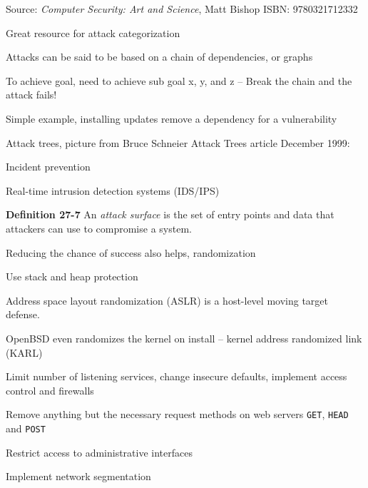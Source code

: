 \documentclass[Screen16to9,17pt]{foils}
\begin{document}
Source:
\emph{Computer Security: Art and Science}, Matt Bishop ISBN: 9780321712332\\
{\footnotesize{}}




Great resource for attack categorization



\begin{list2}
\item Attacks can be said to be based on a chain of dependencies, or graphs
\item To achieve goal, need to achieve sub goal x, y, and z -- Break the chain and the attack fails!
\item Simple example, installing updates remove a dependency for a vulnerability
\item Attack trees, picture from Bruce Schneier Attack Trees article December 1999:\\ {\footnotesize{}}
\end{list2}


\begin{list2}
\item Incident prevention
\item Real-time intrusion detection systems (IDS/IPS)
\item {\bf Definition 27-7} An \emph{attack surface} is the set of entry points and data that attackers can use to compromise a system.
\item Reducing the chance of success also helps, randomization
\item Use stack and heap protection
\item Address space layout randomization (ASLR) is a host-level moving target defense.
\item OpenBSD even randomizes the kernel on install -- kernel address randomized link (KARL)
\item Limit number of listening services, change insecure defaults, implement access control and firewalls
\item Remove anything but the necessary request methods on web servers \verb+GET+, \verb+HEAD+ and \verb+POST+
\item Restrict access to administrative interfaces
\item Implement network segmentation
\end{list2}
\end{document}
